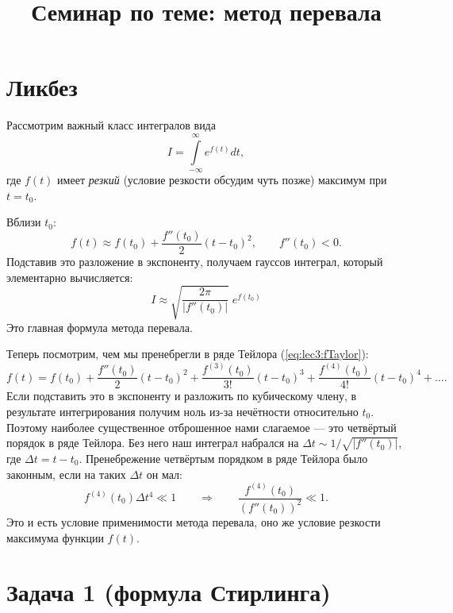 \documentclass[a4paper,12pt]{article}
\begin{document}
\title{Семинар по теме: метод перевала}
\maketitle

\section*{Ликбез}
Рассмотрим важный класс интегралов вида
\begin{equation} \label{eq:lec3:I}
I = \int\limits_{-\infty}^\infty e^{f(t)} dt,
\end{equation}
где $f(t)$ имеет \emph{резкий} (условие резкости обсудим чуть позже) максимум при $t=t_0$.

\noindent
Вблизи $t_0$:
\begin{equation} 
\label{eq:lec3:fTaylor}
f(t) \approx f(t_0) + \frac{f''(t_0)}2 (t-t_0)^2,\qquad f''(t_0) <0.
\end{equation}
Подставив это разложение в экспоненту, получаем гауссов интеграл, который элементарно вычисляется:
\begin{equation} \label{eq:lec3:Isaddle}
\boxed{I \approx
	\sqrt{ \frac{2\pi}{|f''(t_0)|} } \; e^{f(t_0)} }
\end{equation}
Это главная формула метода перевала.

Теперь посмотрим, чем мы пренебрегли в ряде Тейлора (\ref{eq:lec3:fTaylor}):
\[
f(t) = f(t_0) + \frac{f''(t_0)}2 (t-t_0)^2 + \frac{f^{(3)}(t_0)}{3!} (t-t_0)^3  + \frac{f^{(4)}(t_0)}{4!} (t-t_0)^4 + \dots  .
\]
Если подставить это в экспоненту и разложить по кубическому члену, в результате интегрирования получим ноль из-за нечётности относительно $t_0$. Поэтому наиболее существенное отброшенное нами слагаемое --- это четвёртый порядок в ряде Тейлора. Без него наш интеграл набрался на $\Delta t \sim 1/\sqrt{|f''(t_0)|}$, где $\Delta t = t-t_0$. Пренебрежение четвёртым порядком в ряде Тейлора было законным, если на таких $\Delta t$ он мал:
\begin{equation} \label{eq:lec3:condition}
f^{(4)} (t_0) \Delta t^4 \ll 1
\qquad\Longrightarrow\qquad
\frac{f^{(4)}(t_0)}{\left( f''(t_0) \right)^2} \ll 1.
\end{equation}
Это и есть условие применимости метода перевала, оно же условие резкости максимума функции $f(t)$.

\section*{Задача 1 (формула Стирлинга)}
\end{document}
